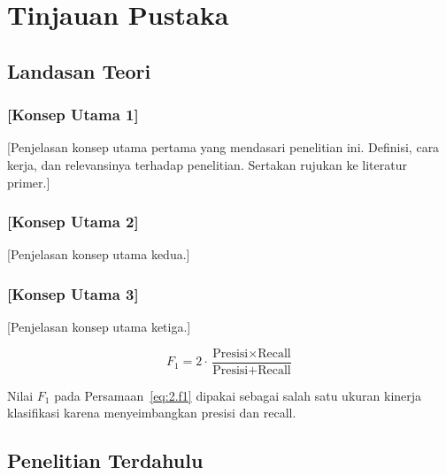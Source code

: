 
\chapter{Tinjauan Pustaka}

\section{Landasan Teori}
\label{sec:2.1}

\subsection{[Konsep Utama 1]}
\label{sec:2.1.1}

[Penjelasan konsep utama pertama yang mendasari penelitian ini. Definisi, cara kerja,
dan relevansinya terhadap penelitian. Sertakan rujukan ke literatur primer.]

\subsection{[Konsep Utama 2]}
\label{sec:2.1.2}

[Penjelasan konsep utama kedua.]

\subsection{[Konsep Utama 3]}
\label{sec:2.1.3}

[Penjelasan konsep utama ketiga.]

\begin{equation}
  F_1 = 2 \cdot \frac{\text{Presisi} \times \text{Recall}}{\text{Presisi} + \text{Recall}}
  \label{eq:2.f1}
\end{equation}

Nilai $F_1$ pada Persamaan~\eqref{eq:2.f1} dipakai sebagai salah satu ukuran kinerja
klasifikasi karena menyeimbangkan presisi dan recall.

\section{Penelitian Terdahulu}
\label{sec:2.2}

